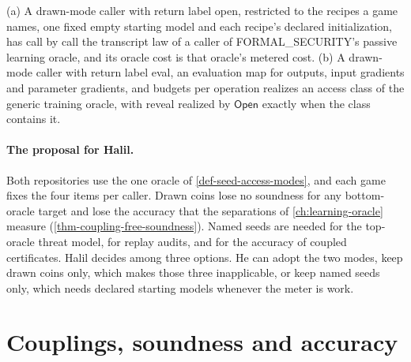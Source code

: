 \begin{proposition}
(a) A drawn-mode caller with return label open, restricted to the recipes a game
names, one fixed empty starting model and each recipe's declared initialization,
has call by call the transcript law of a caller of FORMAL\_SECURITY's passive
learning oracle, and its oracle cost is that oracle's metered cost. (b) A drawn-mode
caller with return label eval, an evaluation map for outputs, input gradients and
parameter gradients, and budgets per operation realizes an access class of the
generic training oracle, with reveal realized by $\mathsf{Open}$ exactly when the class
contains it.
\end{proposition}

\paragraph{The proposal for Halil.} Both repositories use the one oracle of
\cref{def-seed-access-modes}, and each game fixes the four items per caller. Drawn
coins lose no soundness for any bottom-oracle target and lose the accuracy that
the separations of \cref{ch:learning-oracle} measure (\cref{thm-coupling-free-soundness}).
Named seeds are needed for the top-oracle threat model, for replay audits, and for
the accuracy of coupled certificates. Halil decides among three options. He can adopt the two
modes, keep drawn coins only, which makes those three inapplicable, or keep named
seeds only, which needs declared starting models whenever the meter is work.

\section{Couplings, soundness and accuracy}

